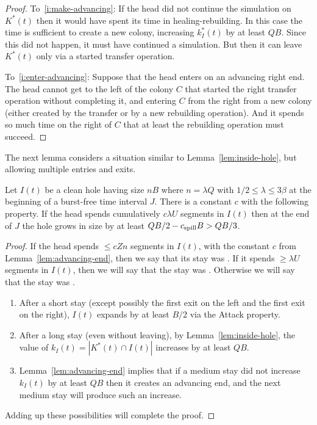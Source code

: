 \documentclass[11pt]{memoir}
\theoremstyle{definition} %
\renewcommand{\le}{\leq}
\renewcommand{\ge}{\geq}
\def\B{B}
\def\U{U}
\newcommand{\Q}{Q}
\newcommand{\Z}{Z}
\newcommand{\cns}[1]{c_{\textrm{\upshape #1}}}
\newcommand{\CSpill}{\cns{spill}}
\begin{document}
\begin{proof}
  To~\eqref{i:make-advancing}:
  If the head did not continue the simulation on \( K^{*}(t) \) then it would have spent its time in
  healing-rebuilding.
  In this case the time is sufficient to create a new colony, increasing \( k^{*}_{I}(t) \) by at least
  \( \Q\B \).
  Since this did not happen, it must have continued a simulation.
  But then it can leave \( K^{*}(t) \) only via a started transfer operation.

  To~\eqref{i:enter-advancing}:
  Suppose that the head enters on an advancing right end.
  The head cannot get to the left of the colony \( C \) 
  that started the right transfer operation without completing it, and entering \( C \) from
  the right from a new colony (either created by the transfer or by a new rebuilding operation).
  And it spends so much time on the right of \( C \) that at least the rebuilding operation must
  succeed.
\end{proof}

The next lemma considers a situation similar to Lemma~\ref{lem:inside-hole},
but allowing multiple entries and exits.

\begin{lemma}\label{lem:expand-hole}
  Let \( I(t) \) be a clean hole having size \( n\B \) where \( n=\lambda\Q \)
  with \(  1/2\le\lambda\le 3\beta \) at the
  beginning of a burst-free time interval \( J \).
  There is a constant \( c \) with the following property.
  If the head spends cumulatively
  \( c\lambda\U \) segments in \( I(t) \) then at the end of \( J \) the hole grows
  in size by at least \( \Q\B/2-\CSpill\B > \Q\B/3 \).
\end{lemma}
\begin{proof}\begin{sloppypar}
If the head spends \( \le c\Z n \) segments in \( I(t) \), with the constant \( c \)
from Lemma~\ref{lem:advancing-end}, then we say that its stay was .
If it spends \( \ge\lambda\U \) segments in \( I(t) \),
then we will say that the stay was .
Otherwise we will say that the stay was .
  \end{sloppypar}
\begin{enumerate}

\item\label{i:fast-return} After a short stay (except possibly the first exit on the left and
  the first exit on the right), \( I(t) \) expands by at least \( \B/2 \) via the Attack property.

\item\label{i:long-time return}
  After a long stay (even without leaving), by Lemma~\ref{lem:inside-hole}, the
  value of \( k_{I}(t)= |K^{*}(t)\cap I(t)| \) increases by at least \( \Q\B \).

\item\label{i:medium stay}
  Lemma~\ref{lem:advancing-end} implies that if a medium stay did not increase
  \( k_{I}(t) \) by at least \( \Q\B \) then it creates an advancing end, and
  the next medium stay will produce such an increase.
  \end{enumerate}
    Adding up these possibilities will complete the proof.
\end{proof}
\end{document}
